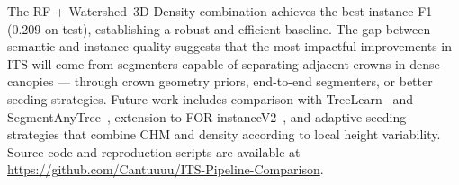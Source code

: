 \documentclass[runningheads]{llncs}
\begin{document}
The RF + Watershed~3D Density combination achieves the best instance F1 (0.209 on test), establishing a robust and efficient baseline. The gap between semantic and instance quality suggests that the most impactful improvements in ITS will come from segmenters capable of separating adjacent crowns in dense canopies --- through crown geometry priors, end-to-end segmenters, or better seeding strategies. Future work includes comparison with TreeLearn~\cite{henrich2024} and SegmentAnyTree~\cite{wielgosz2024}, extension to FOR-instanceV2~\cite{xiang2025}, and adaptive seeding strategies that combine CHM and density according to local height variability. Source code and reproduction scripts are available at \url{https://github.com/Cantuuuu/ITS-Pipeline-Comparison}.

\end{document}

